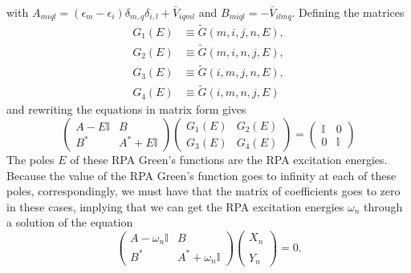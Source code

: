 with $A_{m i q l} = \left(\epsilon_m-\epsilon_i\right) \delta_{m, q} \delta_{i, l}+\bar{V}_{i q m l}$ and $B_{m i q l} = -\bar{V}_{i l m q}$. Defining the matrices
\begin{align}
    G_1(E) &\equiv \tilde{G}(m, i, j, n, E), \\
    G_2(E) &\equiv \tilde{G}(m, i, n, j, E), \\
    G_3(E) &\equiv \tilde{G}(i, m, j, n, E), \\
    G_4(E) &\equiv \tilde{G}(i, m, n, j, E)
\end{align}
and rewriting the equations in matrix form gives
\begin{equation}
    \begin{pmatrix}
    A-E \mathbb{I} & B \\
    B^* & A^*+E \mathbb{I}
    \end{pmatrix}
    \begin{pmatrix}
    G_1(E) & G_2(E) \\
    G_3(E) & G_4(E)
\end{pmatrix}
    =
    \begin{pmatrix}
    \mathbb{I} & 0 \\
    0 & \mathbb{I}
    \end{pmatrix}
\end{equation}
The poles $E$ of these RPA Green's functions are the RPA excitation energies. Because the value of the RPA Green's function goes to infinity at each of these poles, correspondingly, we must have that the matrix of coefficients goes to zero in these cases, implying that we can get the RPA excitation energies $\omega _{n}$ through a solution of the equation
\begin{equation}
\left(\begin{array}{cc}
A-\omega_n \mathbb{I} & B \\
B^* & A^*+\omega_n \mathbb{I}
\end{array}\right)\left(\begin{array}{c}
X_n \\
\\
Y_n
\end{array}\right)=0.
\end{equation}

